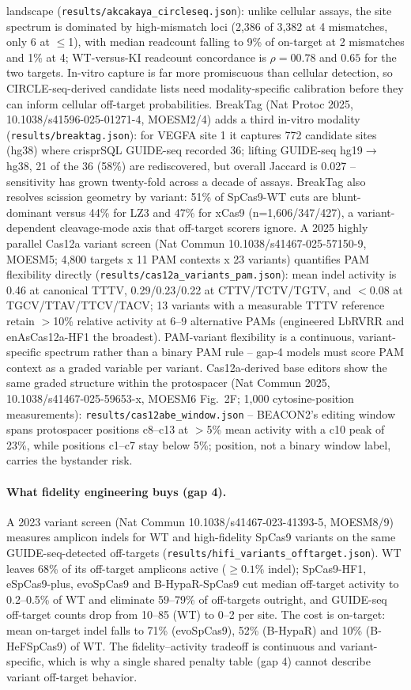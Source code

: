 \documentclass[12pt]{article}
\begin{document}
landscape (\texttt{results/akcakaya\_circleseq.json}): unlike cellular
assays, the site spectrum is dominated by high-mismatch loci (2,386 of
3,382 at 4 mismatches, only 6 at $\le$1), with median readcount falling
to 9\% of on-target at 2 mismatches and 1\% at 4; WT-versus-KI
readcount concordance is $\rho=00.78$ and $0.65$ for the two targets.
In-vitro capture is far more promiscuous than cellular detection, so
CIRCLE-seq-derived candidate lists need modality-specific calibration
before they can inform cellular off-target probabilities.
BreakTag (Nat Protoc 2025, 10.1038/s41596-025-01271-4, MOESM2/4) adds a
third in-vitro modality (\texttt{results/breaktag.json}): for VEGFA
site 1 it captures 772 candidate sites (hg38) where crisprSQL GUIDE-seq
recorded 36; lifting GUIDE-seq hg19$\to$hg38, 21 of the 36 (58\%) are
rediscovered, but overall Jaccard is 0.027 -- sensitivity has grown
twenty-fold across a decade of assays. BreakTag also resolves scission
geometry by variant: 51\% of SpCas9-WT cuts are blunt-dominant versus
44\% for LZ3 and 47\% for xCas9 (n=1{,}606/347/427), a
variant-dependent cleavage-mode axis that off-target scorers ignore.
A 2025 highly parallel Cas12a variant screen (Nat Commun
10.1038/s41467-025-57150-9, MOESM5; 4,800 targets x 11 PAM contexts x
23 variants) quantifies PAM flexibility directly
(\texttt{results/cas12a\_variants\_pam.json}): mean indel activity is
0.46 at canonical TTTV, 0.29/0.23/0.22 at CTTV/TCTV/TGTV, and
$<0.08$ at TGCV/TTAV/TTCV/TACV; 13 variants with a measurable TTTV
reference retain $>$10\% relative activity at 6--9 alternative PAMs
(engineered LbRVRR and enAsCas12a-HF1 the broadest). PAM-variant
flexibility is a continuous, variant-specific spectrum rather than a
binary PAM rule -- gap-4 models must score PAM context as a graded
variable per variant.
Cas12a-derived base editors show the same graded structure within the
protospacer (Nat Commun 2025, 10.1038/s41467-025-59653-x, MOESM6
Fig.\ 2F; 1,000 cytosine-position measurements):
\texttt{results/cas12abe\_window.json} -- BEACON2's editing window
spans protospacer positions c8--c13 at $>$5\% mean activity with a
c10 peak of 23\%, while positions c1--c7 stay below 5\%; position, not
a binary window label, carries the bystander risk.
\paragraph{What fidelity engineering buys (gap 4).} A 2023 variant
screen (Nat Commun 10.1038/s41467-023-41393-5, MOESM8/9) measures
amplicon indels for WT and high-fidelity SpCas9 variants on the same
GUIDE-seq-detected off-targets
(\texttt{results/hifi\_variants\_offtarget.json}). WT leaves 68\% of its
off-target amplicons active ($\ge0.1\%$ indel); SpCas9-HF1,
eSpCas9-plus, evoSpCas9 and B-HypaR-SpCas9 cut median off-target
activity to 0.2--0.5\% of WT and eliminate 59--79\% of off-targets
outright, and GUIDE-seq off-target counts drop from 10--85 (WT) to
0--2 per site. The cost is on-target: mean on-target indel falls to
71\% (evoSpCas9), 52\% (B-HypaR) and 10\% (B-HeFSpCas9) of WT. The
fidelity--activity tradeoff is continuous and variant-specific, which
is why a single shared penalty table (gap 4) cannot describe variant
off-target behavior.
\end{document}
